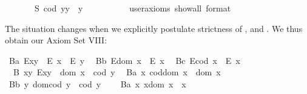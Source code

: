 \begin{isabellebody}
\isadelimproof
\ %
\endisadelimproof
%
\isatagproof
{}\isamarkupfalse%
%
\endisatagproof
{\isafoldproof}%
%
\isadelimproof
%
\endisadelimproof
\ \isanewline
\ \ \isamarkupfalse%
\ S{}{\isacharcolon}\ {\isachardoublequoteopen}{\isacharparenleft}cod\ y{\isacharparenright}{\isasymcdot}y\ {\isasymcong}\ y{\isachardoublequoteclose}\ \ \ %
\ \isanewline
\ \ \ \ \isamarkupfalse%
\ {\isacharbrackleft}user{\isacharunderscore}axioms{\isacharcomma}\ show{\isacharunderscore}all{\isacharcomma}\ format\ {\isacharequal}\ {}{\isacharbrackright}%
\isadelimproof
\ %
\endisadelimproof
%
\isatagproof
{}\isamarkupfalse%
%
\endisatagproof
{\isafoldproof}%
%
\isadelimproof
%
\endisadelimproof
%
\begin{isamarkuptext}%
The situation changes when we explicitly postulate strictness of ,
 and \isa{{\isasymcdot}}. We thus obtain our Axiom Set VIII:%
\end{isamarkuptext}\isamarkuptrue%
\ B{}a{\isacharcolon}\ {\isachardoublequoteopen}E{\isacharparenleft}x{\isasymcdot}y{\isacharparenright}\ \isactrlbold {\isasymrightarrow}\ {\isacharparenleft}E\ x\ \isactrlbold {\isasymand}\ E\ y{\isacharparenright}{\isachardoublequoteclose}\ \isanewline
\ B{}b{\isacharcolon}\ {\isachardoublequoteopen}E{\isacharparenleft}dom\ x{\isacharparenright}\ \isactrlbold {\isasymrightarrow}\ E\ x{\isachardoublequoteclose}\ \isanewline
\ B{}c{\isacharcolon}\ {\isachardoublequoteopen}E{\isacharparenleft}cod\ x{\isacharparenright}\ \isactrlbold {\isasymrightarrow}\ E\ x{\isachardoublequoteclose}\ \isanewline
\ \ B{}{\isacharcolon}\ {\isachardoublequoteopen}\isactrlbold {\isasymforall}x{\isachardot}\isactrlbold {\isasymforall}y{\isachardot}\ E{\isacharparenleft}x{\isasymcdot}y{\isacharparenright}\ \isactrlbold {\isasymleftrightarrow}\ dom\ x\ {\isasymcong}\ cod\ y{\isachardoublequoteclose}\ \isanewline
\ B{}a{\isacharcolon}\ {\isachardoublequoteopen}\isactrlbold {\isasymforall}x{\isachardot}\ cod{\isacharparenleft}dom\ x{\isacharparenright}\ {\isasymcong}\ dom\ x\ {\isachardoublequoteclose}\ \ \ \isanewline
\ B{}b{\isacharcolon}\ {\isachardoublequoteopen}\isactrlbold {\isasymforall}y{\isachardot}\ dom{\isacharparenleft}cod\ y{\isacharparenright}\ {\isasymcong}\ cod\ y{\isachardoublequoteclose}\ \ \ \isanewline
\ B{}a{\isacharcolon}\ {\isachardoublequoteopen}\isactrlbold {\isasymforall}x{\isachardot}\ x{\isasymcdot}{\isacharparenleft}dom\ x{\isacharparenright}\ {\isasymcong}\ x{\isachardoublequoteclose}\ \ \isanewline

\end{isabellebody}
